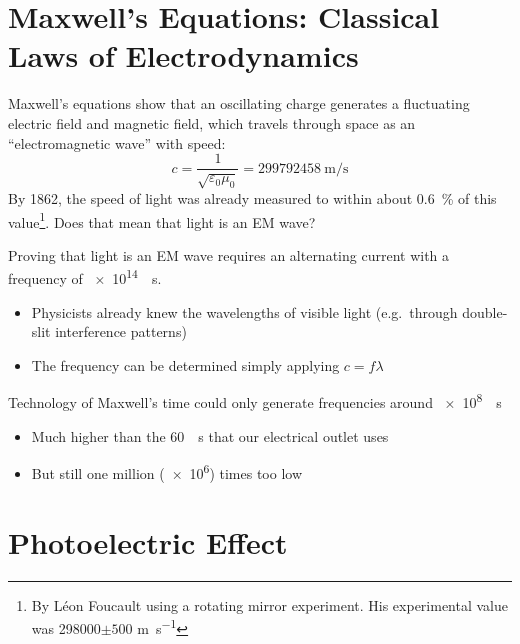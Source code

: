 \section{Maxwell's Equations: Classical Laws of Electrodynamics}  

Maxwell's equations show that an oscillating charge generates a fluctuating
electric field and magnetic field, which travels through space as an
``electromagnetic wave'' with speed:
\begin{equation*}
  c=\frac1{\sqrt{\varepsilon_0\mu_0}}=\SI{299792458}{\meter\per\second}
\end{equation*}
By 1862, the speed of light was already measured to within about
\SI{.6}{\percent} of this value\footnote{By L\'{e}on Foucault using a
rotating mirror experiment. His experimental value was
\num{298000}$\pm 500$ \si{\metre\per\second}}. Does that mean that light is
an EM wave?




Proving that light is an EM wave requires an alternating current with a
frequency of \SI{e14}{\per\second}.
\begin{itemize}
\item Physicists already knew the wavelengths of visible light (e.g.\ through
  double-slit interference patterns)
\item The frequency can be determined simply applying $c=f\lambda$
\end{itemize}

Technology of Maxwell's time could only generate frequencies
around \SI{e8}{\per\second}
\begin{itemize}
\item Much higher than the \SI{60}{\per\second} that our electrical outlet
  uses
\item But still one million (\num{e6}) times too low
\end{itemize}




\section{Photoelectric Effect}

